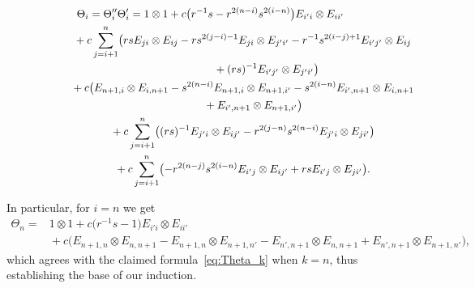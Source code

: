\documentclass[pdftex]{sigma}
\numberwithin{equation}{section}
\begin{document}
\begin{gather}
 \Theta_{i} = \Theta_{i}''\Theta_{i}'
 = 1 \otimes 1 + c\bigl(r^{-1}s-r^{2(n - i)}s^{2(i - n)}\bigr) E_{i'i} \otimes E_{ii'} \nonumber\\
 \hphantom{\Theta_{i} = \Theta_{i}''\Theta_{i}'=}{}
 + c\sum_{j = i + 1}^{n}\bigl(rsE_{ji} \otimes E_{ij} - rs^{2(j - i) - 1}E_{ji} \otimes E_{j'i'} - r^{-1}s^{2(i-j) + 1}E_{i'j'} \otimes E_{ij}\nonumber\\
 \hphantom{\Theta_{i} =\Theta_{i}''\Theta_{i}'= + c\sum_{j = i + 1}^{n}\bigl(}{}
 + (rs)^{-1}E_{i'j'} \otimes E_{j'i'}\bigr) \nonumber\\
 \hphantom{\Theta_{i} =\Theta_{i}''\Theta_{i}'= }{}
 + c\bigl(E_{n + 1,i} \otimes E_{i,n+1} - s^{2(n - i)}E_{n + 1,i} \otimes E_{n+1, i'} - s^{2(i - n)}E_{i',n + 1} \otimes E_{i,n + 1}\nonumber\\
 \hphantom{\Theta_{i} =\Theta_{i}''\Theta_{i}'= + c\bigl(}{}
 + E_{i',n + 1} \otimes E_{n + 1,i'} \bigr) \nonumber\\
 \hphantom{\Theta_{i} =\Theta_{i}''\Theta_{i}' =}{}
 + c\sum_{j = i + 1}^{n}\bigl((rs)^{-1}E_{j'i} \otimes E_{ij'} - r^{2(j - n)}s^{2(n - i)}E_{j'i} \otimes E_{ji'} \bigr)\nonumber\\
 \hphantom{\Theta_{i} =\Theta_{i}''\Theta_{i}'= }{}
 +c\sum_{j = i + 1}^{n}\bigl(- r^{2(n - j)}s^{2(i - n)}E_{i'j} \otimes E_{ij'} + rsE_{i'j} \otimes E_{ji'} \bigr).\label{eq:B-individual-Theta}
\end{gather}

In particular, for $i=n$ we get
\begin{align*}
 \Theta_{n}={}&1 \otimes 1 + c\bigl(r^{-1}s-1\bigr) E_{i'i} \otimes E_{ii'}
 \\
 &{}+ c\bigl(E_{n + 1,n} \otimes E_{n,n+1} - E_{n + 1,n} \otimes E_{n+1, n'} - E_{n',n + 1} \otimes E_{n,n + 1} + E_{n',n + 1} \otimes E_{n + 1,n'} \bigr),
\end{align*}
which agrees with the claimed formula~\eqref{eq:Theta_k} when $k = n$, thus establishing the base of our induction.
\end{document}
